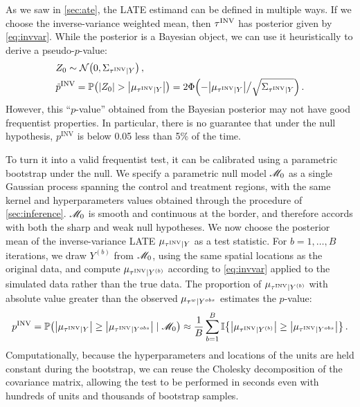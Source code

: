 As we saw in \autoref{sec:ate}, the LATE estimand can be defined in multiple ways.
If we choose the inverse-variance weighted mean, then \(\tau^{\mathrm{INV}}\) has posterior given by \autoref{eq:invvar}.
While the posterior is a Bayesian object, we can use it heuristically to derive a pseudo-\(p\)-value:
\begin{equation}
    \begin{split}
        & Z_0 \sim \normal\del{0, \Sigma_{\invvar \mid Y}} \,, \\
        & \tilde{p}^{\mathrm{INV}} = \Pr\del{ 
            \abs{Z_0} > 
            \abs{
                \mu_{
                    \invvar \mid Y
                }
            } 
        }
        = 2\Phi\del{-
            \abs{
                \mu_{
                    \invvar \mid Y
                }
            }
            \big/
            \sqrt{
                \Sigma_{\invvar \mid Y}
            }
    } \,.
\end{split}
\end{equation}
However, this ``\(p\)-value'' obtained from the Bayesian posterior may not have good frequentist properties.
In particular, there is no guarantee that under the null hypothesis, \(p^{\mathrm{INV}}\) is below 0.05 less than 5\% of the time.

To turn it into a valid frequentist test, it can be calibrated using a parametric bootstrap under the null.
We specify a parametric null model \(\mathscr{M}_0\)
as a single Gaussian process spanning the control and treatment regions,
with the same kernel and hyperparameters values obtained through the procedure of \autoref{sec:inference}.
\(\mathscr{M}_0\) is smooth and continuous at the border,
and therefore accords with both the sharp and weak null hypotheses.
We now choose the posterior mean of the inverse-variance LATE \(\mu_{\tau^{\mathrm{INV}} \mid Y}\) as a test statistic.
For \(b=1,\dotsc,B\) iterations, we draw \(Y^{(b)}\) from \(\mathscr{M}_0\),
using the same spatial locations as the original data,
and compute \(\mu_{\tau^{\mathrm{INV}} \mid Y^{(b)}}\) according to \autoref{eq:invvar} applied to the simulated data rather than the true data.
The proportion of \(\mu_{\tau^{\mathrm{INV}} \mid Y^{(b)}}\) with absolute value greater than the observed \(\mu_{\tau^{w} \mid Y^{obs}}\) estimates the \(p\)-value:
\begin{equation}
    p^{\mathrm{INV}} = \Pr\del{ \abs{\mu_{\invvar \mid Y}} \ge \abs{\mu_{\invvar \mid Y^{obs}}} \mid \modnull} 
    \approx \frac{1}{B} 
    \sum_{b=1}^B 
        \Ind\cbr{
            \abs{
                \mu_{\invvar \mid Y^{(b)}}
            } 
            \ge  
            \abs{
                \mu_{\invvar \mid Y^{obs}}
            } 
        }
    \,.
\end{equation}
Computationally, because the hyperparameters and locations of the units are held constant during the bootstrap, we can reuse the Cholesky decomposition of the covariance matrix, allowing the test to be performed in seconds even with hundreds of units and thousands of bootstrap samples.

